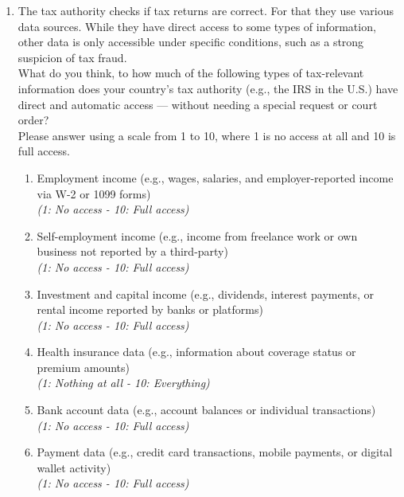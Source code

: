 \documentclass[11pt]{article}
\begin{document}
\begin{enumerate}[resume]
    \item The tax authority checks if tax returns are correct. For that they use various data sources. While they have direct access to some types of information, other data is only accessible under specific conditions, such as a strong suspicion of tax fraud.\\
    What do you think, to how much of the following types of tax-relevant information does your country’s tax authority (e.g., the IRS in the U.S.) have direct and automatic access — without needing a special request or court order? \\ 
    Please answer using a scale from 1 to 10, where 1 is no access at all and 10 is full access.
    \begin{enumerate}[label=\alph*)]
        \item Employment income (e.g., wages, salaries, and employer-reported income via W-2 or 1099 forms) \\ \textit{(1: No access - 10: Full access)}
        \item Self-employment income (e.g., income from freelance work or own business not reported by a third-party) \\ \textit{(1: No access - 10: Full access)}
        \item Investment and capital income (e.g., dividends, interest payments, or rental income reported by banks or platforms) \\ \textit{(1: No access - 10: Full access)}
        \item Health insurance data (e.g., information about coverage status or premium amounts) \\ \textit{(1: Nothing at all - 10: Everything)}
        \item Bank account data (e.g., account balances or individual transactions) \\ \textit{(1: No access - 10: Full access)}
        \item Payment data (e.g., credit card transactions, mobile payments, or digital wallet activity) \\ \textit{(1: No access - 10: Full access)}
    \end{enumerate}
\end{enumerate}
\end{document}
